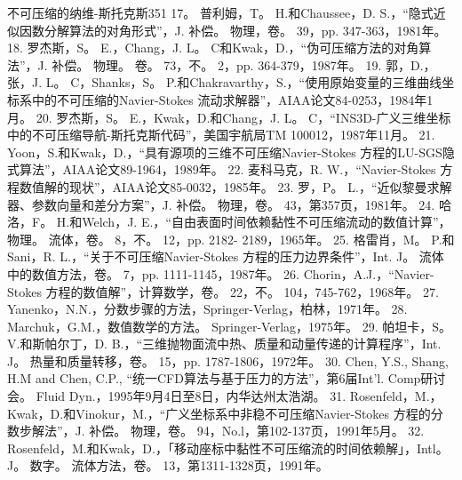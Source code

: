 \documentclass[UTF8,11pt,a4paper,openany,fontset=fandol]{ctexbook}
\begin{document}
不可压缩的纳维-斯托克斯351 17。 普利姆，T。 H.和Chaussee，D. S.，“隐式近似因数分解算法的对角形式”，J. 补偿。 物理，卷。 39，pp. 347-363，1981年。 18. 罗杰斯，S。 E.，Chang，J. L。 C和Kwak，D.，“伪可压缩方法的对角算法”，J. 补偿。 物理。 卷。 73，不。 2，pp. 364-379，1987年。 19. 郭，D.，张，J. L。 C，Shanks，S。 P.和Chakravarthy，S.，“使用原始变量的三维曲线坐标系中的不可压缩的Navier-Stokes 流动求解器”，AIAA论文84-0253，1984年1月。 20. 罗杰斯，S。 E.，Kwak，D.和Chang，J. L。 C，“INS3D-广义三维坐标中的不可压缩导航-斯托克斯代码”，美国宇航局TM 100012，1987年11月。 21. Yoon，S.和Kwak，D.，“具有源项的三维不可压缩Navier-Stokes 方程的LU-SGS隐式算法”，AIAA论文89-1964，1989年。 22. 麦科马克，R. W.，“Navier-Stokes 方程数值解的现状”，AIAA论文85-0032，1985年。 23. 罗，P。 L.，“近似黎曼求解器、参数向量和差分方案”，J. 补偿。 物理，卷。 43，第357页，1981年。 24. 哈洛，F。 H.和Welch，J. E.，“自由表面时间依赖黏性不可压缩流动的数值计算”，物理。 流体，卷。 8，不。 12，pp. 2182- 2189，1965年。 25. 格雷肖，M。 P.和Sani，R. L.，“关于不可压缩Navier-Stokes 方程的压力边界条件”，Int. J。 流体中的数值方法，卷。 7，pp. 1111-1145，1987年。 26. Chorin，A.J.，“Navier-Stokes 方程的数值解”，计算数学，卷。 22，不。 104，745-762，1968年。 27. Yanenko，N.N.，分数步骤的方法，Springer-Verlag，柏林，1971年。 28. Marchuk，G.M.，数值数学的方法。 Springer-Verlag，1975年。 29. 帕坦卡，S。 V.和斯帕尔丁，D. B.，“三维抛物面流中热、质量和动量传递的计算程序”，Int. J。 热量和质量转移，卷。 15，pp. 1787-1806，1972年。 30. Chen, Y.S., Shang, H.M and Chen, C.P., “统一CFD算法与基于压力的方法”，第6届Int'l. Comp研讨会。 Fluid Dyn.，1995年9月4日至8日，内华达州太浩湖。 31. Rosenfeld，M.，Kwak，D.和Vinokur，M.，“广义坐标系中非稳不可压缩Navier-Stokes 方程的分数步解法”，J. 补偿。 物理，卷。 94，No.l，第102-137页，1991年5月。 32. Rosenfeld，M.和Kwak，D.，「移动座标中黏性不可压缩流的时间依赖解」，Intl。 J。 数字。 流体方法，卷。 13，第1311-1328页，1991年。
\end{document}
